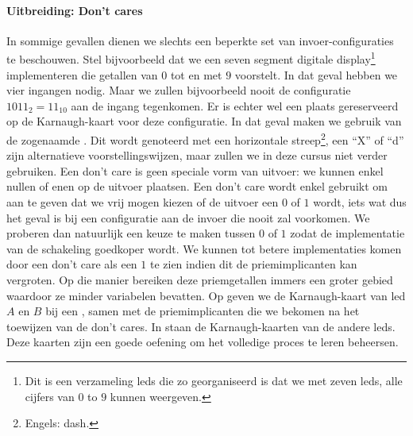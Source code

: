 \paragraph{Uitbreiding: Don't cares}
In sommige gevallen dienen we slechts een beperkte set van invoer-configuraties te beschouwen. Stel bijvoorbeeld dat we een seven segment digitale display\footnote{Dit is een verzameling leds die zo georganiseerd is dat we met zeven leds, alle cijfers van $0$ to $9$ kunnen weergeven.} implementeren die getallen van $0$ tot en met $9$ voorstelt. In dat geval hebben we vier ingangen nodig. Maar we zullen bijvoorbeeld nooit de configuratie $1011_2=11_{10}$ aan de ingang tegenkomen. Er is echter wel een plaats gereserveerd op de Karnaugh-kaart voor deze configuratie. In dat geval maken we gebruik van de zogenaamde . Dit wordt genoteerd met een horizontale streep\footnote{Engels: dash.}, een ``X'' of ``d'' zijn alternatieve voorstellingswijzen, maar zullen we in deze cursus niet verder gebruiken. Een don't care is geen speciale vorm van uitvoer: we kunnen enkel nullen of enen op de uitvoer plaatsen. Een don't care wordt enkel gebruikt om aan te geven dat we vrij mogen kiezen of de uitvoer een $0$ of $1$ wordt, iets wat dus het geval is bij een configuratie aan de invoer die nooit zal voorkomen. We proberen dan natuurlijk een keuze te maken tussen $0$ of $1$ zodat de implementatie van de schakeling goedkoper wordt. We kunnen tot betere implementaties komen door een don't care als een $1$ te zien indien dit de priemimplicanten kan vergroten. Op die manier bereiken deze priemgetallen immers een groter gebied waardoor ze minder variabelen bevatten. Op  geven we de Karnaugh-kaart van led $A$ en $B$ bij een , samen met de priemimplicanten die we bekomen na het toewijzen van de don't cares. In  staan de Karnaugh-kaarten van de andere leds. Deze kaarten zijn een goede oefening om het volledige proces te leren beheersen.

